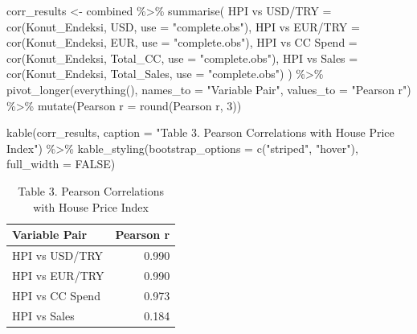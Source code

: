 \documentclass[
  11pt,
  a4paper,
]{article}
\newenvironment{Shaded}{\begin{snugshade}}{\end{snugshade}}
\newcommand{\AttributeTok}[1]{\textcolor[rgb]{0.40,0.45,0.13}{#1}}
\newcommand{\ConstantTok}[1]{\textcolor[rgb]{0.56,0.35,0.01}{#1}}
\newcommand{\DecValTok}[1]{\textcolor[rgb]{0.68,0.00,0.00}{#1}}
\newcommand{\FunctionTok}[1]{\textcolor[rgb]{0.28,0.35,0.67}{#1}}
\newcommand{\NormalTok}[1]{\textcolor[rgb]{0.00,0.23,0.31}{#1}}
\newcommand{\OtherTok}[1]{\textcolor[rgb]{0.00,0.23,0.31}{#1}}
\newcommand{\SpecialCharTok}[1]{\textcolor[rgb]{0.37,0.37,0.37}{#1}}
\newcommand{\StringTok}[1]{\textcolor[rgb]{0.13,0.47,0.30}{#1}}
\begin{document}
\begin{Shaded}
\begin{Highlighting}[]
\NormalTok{corr\_results }\OtherTok{\textless{}{-}}\NormalTok{ combined }\SpecialCharTok{\%\textgreater{}\%}
  \FunctionTok{summarise}\NormalTok{(}
    \StringTok{\textasciigrave{}}\AttributeTok{HPI vs USD/TRY}\StringTok{\textasciigrave{}}  \OtherTok{=} \FunctionTok{cor}\NormalTok{(Konut\_Endeksi, USD,          }\AttributeTok{use =} \StringTok{"complete.obs"}\NormalTok{),}
    \StringTok{\textasciigrave{}}\AttributeTok{HPI vs EUR/TRY}\StringTok{\textasciigrave{}}  \OtherTok{=} \FunctionTok{cor}\NormalTok{(Konut\_Endeksi, EUR,          }\AttributeTok{use =} \StringTok{"complete.obs"}\NormalTok{),}
    \StringTok{\textasciigrave{}}\AttributeTok{HPI vs CC Spend}\StringTok{\textasciigrave{}} \OtherTok{=} \FunctionTok{cor}\NormalTok{(Konut\_Endeksi, Total\_CC,     }\AttributeTok{use =} \StringTok{"complete.obs"}\NormalTok{),}
    \StringTok{\textasciigrave{}}\AttributeTok{HPI vs Sales}\StringTok{\textasciigrave{}}    \OtherTok{=} \FunctionTok{cor}\NormalTok{(Konut\_Endeksi, Total\_Sales,   }\AttributeTok{use =} \StringTok{"complete.obs"}\NormalTok{)}
\NormalTok{  ) }\SpecialCharTok{\%\textgreater{}\%}
  \FunctionTok{pivot\_longer}\NormalTok{(}\FunctionTok{everything}\NormalTok{(), }\AttributeTok{names\_to =} \StringTok{"Variable Pair"}\NormalTok{, }\AttributeTok{values\_to =} \StringTok{"Pearson r"}\NormalTok{) }\SpecialCharTok{\%\textgreater{}\%}
  \FunctionTok{mutate}\NormalTok{(}\StringTok{\textasciigrave{}}\AttributeTok{Pearson r}\StringTok{\textasciigrave{}} \OtherTok{=} \FunctionTok{round}\NormalTok{(}\StringTok{\textasciigrave{}}\AttributeTok{Pearson r}\StringTok{\textasciigrave{}}\NormalTok{, }\DecValTok{3}\NormalTok{))}

\FunctionTok{kable}\NormalTok{(corr\_results,}
      \AttributeTok{caption =} \StringTok{"Table 3. Pearson Correlations with House Price Index"}\NormalTok{) }\SpecialCharTok{\%\textgreater{}\%}
  \FunctionTok{kable\_styling}\NormalTok{(}\AttributeTok{bootstrap\_options =} \FunctionTok{c}\NormalTok{(}\StringTok{"striped"}\NormalTok{, }\StringTok{"hover"}\NormalTok{), }\AttributeTok{full\_width =} \ConstantTok{FALSE}\NormalTok{)}
\end{Highlighting}
\end{Shaded}

\begin{longtable}[t]{lr}
\caption{\label{tab:corr-table}Table 3. Pearson Correlations with House Price Index}\\
\toprule
Variable Pair & Pearson r\\
\midrule
HPI vs USD/TRY & 0.990\\
HPI vs EUR/TRY & 0.990\\
HPI vs CC Spend & 0.973\\
HPI vs Sales & 0.184\\
\bottomrule
\end{longtable}
\end{document}
